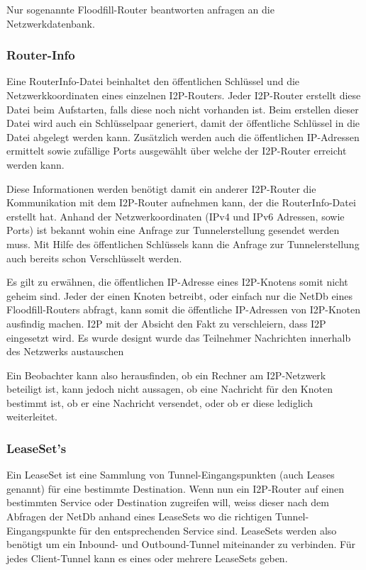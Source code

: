 Nur sogenannte Floodfill-Router beantworten anfragen an die Netzwerkdatenbank.
\parencite[S.~5-6]{timpanaro_monitoring_2011}

\subsubsection{Router-Info}\label{sec:router_info}

Eine RouterInfo-Datei beinhaltet den öffentlichen Schlüssel und die Netzwerkkoordinaten eines einzelnen I2P-Routers.
Jeder I2P-Router erstellt diese Datei beim Aufstarten, falls diese noch nicht vorhanden ist.
Beim erstellen dieser Datei wird auch ein Schlüsselpaar generiert, damit der öffentliche Schlüssel in die Datei abgelegt werden kann.
Zusätzlich werden auch die öffentlichen IP-Adressen ermittelt sowie zufällige Ports ausgewählt über welche der I2P-Router erreicht werden kann.

Diese Informationen werden benötigt damit ein anderer I2P-Router die Kommunikation mit dem I2P-Router aufnehmen kann, der die RouterInfo-Datei erstellt hat.
Anhand der Netzwerkoordinaten (IPv4 und IPv6 Adressen, sowie Ports) ist bekannt wohin eine Anfrage zur Tunnelerstellung gesendet werden muss.
Mit Hilfe des öffentlichen Schlüssels kann die Anfrage zur Tunnelerstellung auch bereits schon Verschlüsselt werden. 

Es gilt zu erwähnen, die öffentlichen IP-Adresse eines I2P-Knotens somit nicht geheim sind.
Jeder der einen Knoten betreibt, oder einfach nur die NetDb eines Floodfill-Routers abfragt, kann somit die öffentliche IP-Adressen von I2P-Knoten ausfindig machen.
I2P mit der Absicht den Fakt zu verschleiern, dass I2P eingesetzt wird.
Es wurde designt wurde das Teilnehmer Nachrichten innerhalb des Netzwerks austauschen 

Ein Beobachter kann also herausfinden, ob ein Rechner am I2P-Netzwerk beteiligt ist, kann jedoch nicht aussagen, ob eine Nachricht für den Knoten bestimmt ist, ob er eine Nachricht versendet, oder ob er diese lediglich weiterleitet.

\subsubsection{LeaseSet's}

Ein LeaseSet ist eine Sammlung von Tunnel-Eingangspunkten (auch Leases genannt) für eine bestimmte Destination.
Wenn nun ein I2P-Router auf einen bestimmten Service oder Destination zugreifen will, weiss dieser nach dem Abfragen der NetDb anhand eines LeaseSets
wo die richtigen Tunnel-Eingangspunkte für den entsprechenden Service sind.
LeaseSets werden also benötigt um ein Inbound- und Outbound-Tunnel miteinander zu verbinden.
Für jedes Client-Tunnel kann es eines oder mehrere LeaseSets geben.
\cite{astolfi_i2p_2015}

